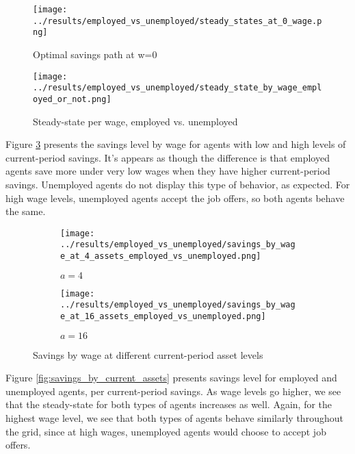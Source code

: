 \documentclass[12pt]{article}
\begin{document}
\begin{figure}[hbt!]
\centering
\texttt{[image: ../results/employed\_vs\_unemployed/steady\_states\_at\_0\_wage.png]}
\caption{Optimal savings path at w=0}
\label{fig:steady_states}
\end{figure}

\begin{figure}[hbt!]
\centering
\texttt{[image: ../results/employed\_vs\_unemployed/steady\_state\_by\_wage\_employed\_or\_not.png]}
\caption{Steady-state per wage, employed vs. unemployed}
\label{fig:steady_state_by_wage_employed_or_not}
\end{figure}

\vspace{5mm}
Figure \ref{fig:savings_by_wage} presents the savings level by wage for agents with low and high levels of current-period savings. It's appears as though the difference is that employed agents save more under very low wages when they have higher current-period savings. Unemployed agents do not display this type of behavior, as expected. For high wage levels, unemployed agents accept the job offers, so both agents behave the same.

\begin{figure}[hbt!]

\begin{subfigure}{0.5\textwidth}
\texttt{[image: ../results/employed\_vs\_unemployed/savings\_by\_wage\_at\_4\_assets\_employed\_vs\_unemployed.png]}
\caption{$a=4$}
\end{subfigure}%
\begin{subfigure}{0.5\textwidth}
\texttt{[image: ../results/employed\_vs\_unemployed/savings\_by\_wage\_at\_16\_assets\_employed\_vs\_unemployed.png]}
\caption{$a=16$}
\end{subfigure}

\caption{Savings by wage at different current-period asset levels}
\label{fig:savings_by_wage}
\end{figure}

\vspace{5mm}
Figure \ref{fig:savings_by_current_assets} presents savings level for employed and unemployed agents, per current-period savings. As wage levels go higher, we see that the steady-state for both types of agents increases as well. Again, for the highest wage level, we see that both types of agents behave similarly throughout the grid, since at high wages, unemployed agents would choose to accept job offers.
\end{document}
